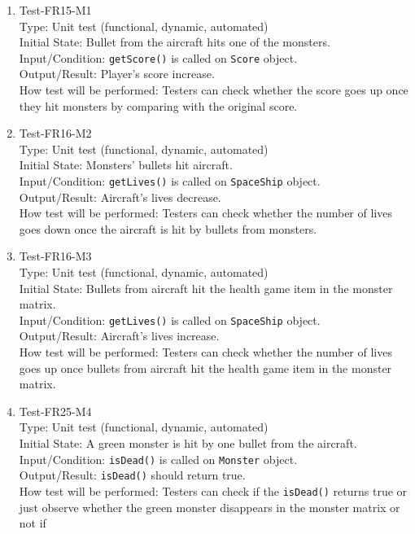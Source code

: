 \documentclass[12pt]{article}
\begin{document}
\begin{enumerate}[1.]
\item Test-FR15-M1\\
Type: Unit test (functional, dynamic, automated)\\
Initial State: Bullet from the aircraft hits one of the monsters.\\
Input/Condition: \verb|getScore()| is called on \verb|Score| object.\\
Output/Result: Player's score increase.\\
How test will be performed: Testers can check whether the score goes up once they hit monsters by comparing with the original score.
\item Test-FR16-M2\\
Type: Unit test (functional, dynamic, automated)\\
Initial State: Monsters’ bullets hit aircraft.\\
Input/Condition: \verb|getLives()| is called on \verb|SpaceShip|
object.\\
Output/Result: Aircraft's lives decrease.\\
How test will be performed: Testers can check whether the number of lives goes down once the aircraft is hit by bullets from monsters.
\item Test-FR16-M3\\
Type: Unit test (functional, dynamic, automated)\\
Initial State: Bullets from aircraft hit the health game item in the monster matrix.\\
Input/Condition: \verb|getLives()| is called on \verb|SpaceShip|
object.\\
Output/Result: Aircraft's lives increase.\\
How test will be performed: Testers can check whether the number of lives goes up once bullets from aircraft hit the health game item in the monster matrix.
\newpage
\item Test-FR25-M4\\
Type: Unit test (functional, dynamic, automated)\\
Initial State: A green monster is hit by one bullet 
from the aircraft.\\
Input/Condition: \verb|isDead()| is called on \verb|Monster| object.\\
Output/Result: \verb|isDead()| should return true.\\
How test will be performed: Testers can check if the \verb|isDead()| returns true or just observe whether the green monster disappears in the monster matrix or not if

\end{enumerate}
\end{document}
